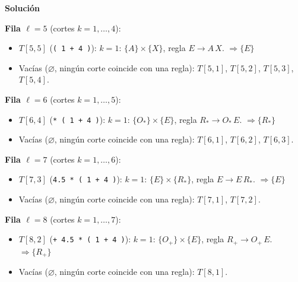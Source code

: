 \documentclass[12pt, letterpaper]{article}
\newenvironment{solucion}{\par\medskip\noindent\textbf{\large Solución}\par\smallskip}{\par\bigskip}
\begin{document}
\begin{enumerate}
\begin{solucion}
  \textbf{Fila $\ell=5$} (cortes $k=1,\dots,4$):
  
  \begin{itemize}[leftmargin=*,itemsep=0pt]
    
  \item $T[5,5]$ (\texttt{( 1 + 4 )}): $k=1$: $\{A\} \times \{X\}$, regla $E \to A\,X$. $\Rightarrow \{E\}$
    
  \item Vacías ($\varnothing$, ningún corte coincide con una regla): $T[5,1]$, $T[5,2]$, $T[5,3]$, $T[5,4]$.
    
  \end{itemize}
  
  \textbf{Fila $\ell=6$} (cortes $k=1,\dots,5$):
  
  \begin{itemize}[leftmargin=*,itemsep=0pt]
    
  \item $T[6,4]$ (\texttt{* ( 1 + 4 )}): $k=1$: $\{O_{*}\} \times \{E\}$, regla $R_{*} \to O_{*}\,E$. $\Rightarrow \{R_{*}\}$
    
  \item Vacías ($\varnothing$, ningún corte coincide con una regla): $T[6,1]$, $T[6,2]$, $T[6,3]$.
    
  \end{itemize}
  
  \textbf{Fila $\ell=7$} (cortes $k=1,\dots,6$):
  
  \begin{itemize}[leftmargin=*,itemsep=0pt]
    
  \item $T[7,3]$ (\texttt{4.5 * ( 1 + 4 )}): $k=1$: $\{E\} \times \{R_{*}\}$, regla $E \to E\,R_{*}$. $\Rightarrow \{E\}$
    
  \item Vacías ($\varnothing$, ningún corte coincide con una regla): $T[7,1]$, $T[7,2]$.
    
  \end{itemize}
  
  \textbf{Fila $\ell=8$} (cortes $k=1,\dots,7$):
  
  \begin{itemize}[leftmargin=*,itemsep=0pt]
    
  \item $T[8,2]$ (\texttt{+ 4.5 * ( 1 + 4 )}): $k=1$: $\{O_{+}\} \times \{E\}$, regla $R_{+} \to O_{+}\,E$. $\Rightarrow \{R_{+}\}$
    
  \item Vacías ($\varnothing$, ningún corte coincide con una regla): $T[8,1]$.
    

\end{itemize}
\end{solucion}
\end{enumerate}
\end{document}
